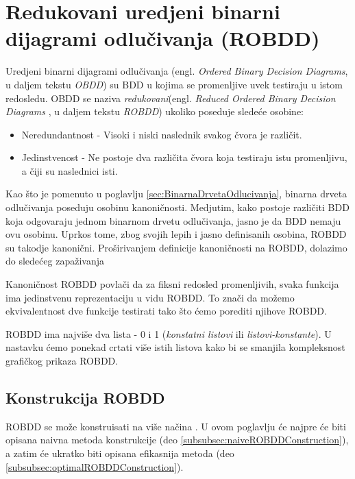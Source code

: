 \section{Redukovani uredjeni binarni dijagrami odlu\v{c}ivanja (ROBDD)}
\label{sec:OBDD}

Uredjeni binarni dijagrami odlu\v{c}ivanja (engl. \emph{Ordered Binary Decision Diagrams}, u daljem tekstu \emph{OBDD}) su BDD u kojima se promenljive uvek testiraju u istom redosledu. OBDD se naziva \emph{redukovani}(engl. \emph{Reduced Ordered Binary Decision Diagrams} \cite{ROBDD}, u daljem tekstu \emph{ROBDD}) ukoliko poseduje slede\'c{}e osobine:
\begin{itemize}
    \item Neredundantnost - Visoki i niski naslednik svakog \v{c}vora je razli\v{c}it.
    \item Jedinstvenost - Ne postoje dva razli\v{c}ita \v{c}vora koja testiraju istu promenljivu, a \v{c}iji su naslednici isti.
\end{itemize}

Kao \v{s}to je pomenuto u poglavlju \ref{sec:BinarnaDrvetaOdlucivanja}, binarna drveta odlu\v{c}ivanja poseduju osobinu kanoni\v{c}nosti. Medjutim, kako postoje razli\v{c}iti BDD koja odgovaraju jednom binarnom drvetu odlu\v{c}ivanja, jasno je da BDD nemaju ovu osobinu. Uprkos tome, zbog svojih lepih i jasno definisanih osobina, ROBDD su takodje kanoni\v{c}ni. Pro\v{s}irivanjem definicije kanoni\v{c}nosti na ROBDD, dolazimo do slede\'c{}eg zapa\v{z}ivanja

\begin{obsn}
    Kanoni\v{c}nost ROBDD povla\v{c}i da za fiksni redosled promenljivih, svaka funkcija ima jedinstvenu reprezentaciju u vidu ROBDD. To zna\v{c}i da mo\v{z}emo ekvivalentnost dve funkcije testirati tako \v{s}to \'c{}emo porediti njihove ROBDD.
\end{obsn}

ROBDD ima najvi\v{s}e dva lista - 0 i 1 (\emph{konstatni listovi} ili \emph{listovi-konstante}). U nastavku \'c{}emo ponekad crtati vi\v{s}e istih listova kako bi se smanjila kompleksnost grafi\v{c}kog prikaza ROBDD.



\subsection{Konstrukcija ROBDD}
\label{subsec:ROBDDConstruction}

ROBDD se mo\v{z}e konstruisati na vi\v{s}e na\v{c}ina \cite{BDD2, BDD}. U ovom poglavlju \'c{}e najpre \'c{}e biti opisana naivna metoda konstrukcije (deo \ref{subsubsec:naiveROBDDConstruction}), a zatim \'c{}e ukratko biti opisana efikasnija metoda (deo \ref{subsubsec:optimalROBDDConstruction}).


